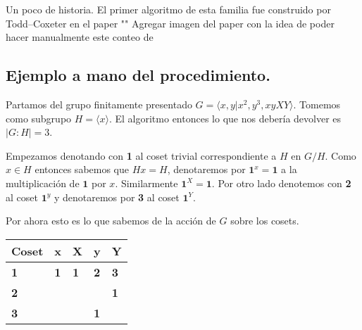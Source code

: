 \documentclass[aspectratio=169, 9pt]{beamer}
\newcommand{\fp}{finitamente presentado }
\begin{document}
\begin{frame}[fragile]{Un poco de historia.}
	El primer algoritmo de esta familia fue construido por Todd--Coxeter en el paper ""
	\alert{Agregar imagen del paper}
	con la idea de poder hacer manualmente este conteo de  
\end{frame}

\begin{frame}[fragile]{}
	\section{Ejemplo a mano del procedimiento.}
	Partamos del grupo \fp $G = \langle x, y | x^2, y^3, xyXY \rangle$.
	\pause
	Tomemos como subgrupo $H = \langle x \rangle$.
	\pause
	El algoritmo entonces lo que nos debería devolver es $|G:H| = 3$.
	\pause
	\medskip
	
	
	Empezamos denotando con \textbf{1} al coset trivial correspondiente a $H$ en $G/H$.
	\pause 
	Como $x \in H$ entonces sabemos que $Hx = H$, denotaremos por $\textbf{1}^x = \textbf{1}$ a la multiplicación de $\textbf{1}$ por $x$.
	Similarmente $\textbf{1}^{X} = \textbf{1}$.
	\pause
	Por otro lado denotemos con \textbf{2} al coset $\textbf{1}^y$ y denotaremos por \textbf{3} al coset $\textbf{1}^{Y}$.
	\pause
	
	Por ahora esto es lo que sabemos de la acción de $G$ sobre los cosets.
	\begin{table}[]
		\begin{tabular}{|l|l|l|l|l|}
			\hline
			Coset     & x          & X          & y          & Y          \\ \hline
			\textbf{1} & \textbf{1} & \textbf{1} & \textbf{2} & \textbf{3} \\ \hline
			\textbf{2} &            &            &            &  \textbf{1}          \\ \hline
			\textbf{3} &            &            &     \textbf{1}       &            \\ \hline
		\end{tabular}
	\end{table}
\end{frame}
\end{document}

